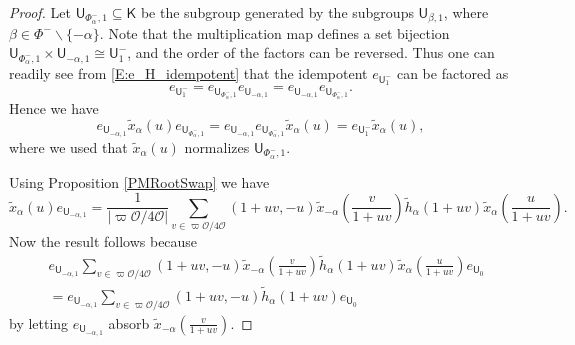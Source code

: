\documentclass[10pt, letterpaper]{amsart}
\theoremstyle{plain}
\theoremstyle{definition}
\numberwithin{equation}{section}
\newcommand{\xt}{\tilde{x}}
\newcommand{\htt}{\tilde{h}}
\newcommand{\Ocal}{\mathcal{O}}
\newcommand{\Kf}{\mathsf{K}}
\newcommand{\Uf}{\mathsf{U}}
\begin{document}
\begin{proof}
Let ${\Uf}_{\Phi^{-}_{\alpha},1}\subseteq {\Kf}$ be the subgroup generated by the subgroups ${\Uf}_{\beta,1}$, where $\beta\in \Phi^{-}\smallsetminus\{-\alpha\}$. Note that the multiplication map defines a set bijection ${\Uf}_{\Phi^{-}_{\alpha},1}\times {\Uf}_{-\alpha,1}\cong {\Uf}_{1}^{-}$, and the order of the factors can be reversed. Thus one can readily see from \eqref{E:e_H_idempotent} that the idempotent $e_{{\Uf}_{1}^{-}}$ can be factored as
\[
	e_{{\Uf}_{1}^{-}}=e_{{\Uf}_{\Phi^{-}_{\alpha},1}}e_{{\Uf}_{-\alpha,1}}=e_{{\Uf}_{-\alpha,1}}e_{{\Uf}_{\Phi^{-}_{\alpha},1}}.
\]
Hence we have
	\begin{equation*}
		e_{{\Uf}_{-\alpha,1}}\xt_{\alpha}(u)e_{{\Uf}_{\Phi^{-}_{\alpha},1}}=e_{{\Uf}_{-\alpha,1}}e_{{\Uf}_{\Phi^{-}_{\alpha},1}}\xt_{\alpha}(u)=e_{{\Uf}_{1}^{-}}\xt_{\alpha}(u),
	\end{equation*}
    where we used that $\xt_{\alpha}(u)$ normalizes ${\Uf}_{\Phi^{-}_{\alpha},1}$.
	
	Using Proposition \ref{PMRootSwap} we have
	\begin{equation*}
		\xt_{\alpha}(u)e_{{\Uf}_{-\alpha,1}}=\frac{1}{\left|\varpi\Ocal\slash 4\Ocal\right|}\sum_{v\in \varpi\mathcal{O}/4\mathcal{O}}(1+uv,-u)\xt_{-\alpha}(\frac{v}{1+uv})\htt_{\alpha}(1+uv) \xt_{\alpha}(\frac{u}{1+uv}).
	\end{equation*}
	Now the result follows because 
	\begin{align*}
		&e_{{\Uf}_{-\alpha,1}}\sum_{v\in \varpi\mathcal{O}/4\mathcal{O}}(1+uv,-u)\xt_{-\alpha}(\frac{v}{1+uv})\htt_{\alpha}(1+uv) \xt_{\alpha}(\frac{u}{1+uv})e_{{\Uf}_{0}}\\
		&=e_{{\Uf}_{-\alpha,1}}\sum_{v\in \varpi\mathcal{O}/4\mathcal{O}}(1+uv,-u)\htt_{\alpha}(1+uv)e_{{\Uf}_{0}}
	\end{align*}
    by letting $e_{{\Uf}_{-\alpha,1}}$ absorb $\xt_{-\alpha}(\frac{v}{1+uv})$.
\end{proof}
\end{document}
